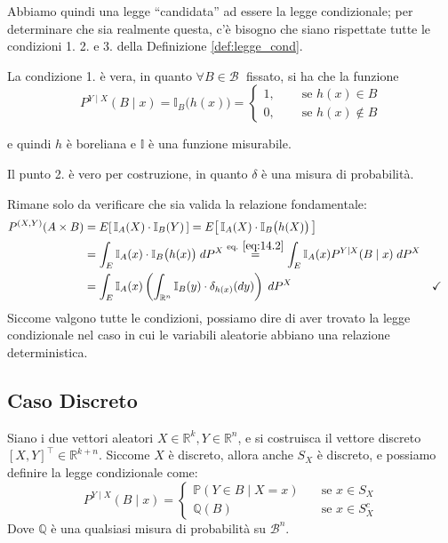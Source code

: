 Abbiamo quindi una legge ``candidata'' ad essere la legge condizionale; per determinare che sia realmente questa, c'è bisogno che siano rispettate tutte le condizioni 1. 2. e 3. della Definizione \ref{def:legge_cond}.

\medskip
\noindent La condizione 1. è vera, in quanto $\forall B\in\mathcal{B}\;$ fissato, si ha che la funzione
\begin{equation}P^{Y\mid X}(B\mid x) = \mathbb{I}_{B}\bigl(h(x)\bigr) = \begin{cases}
    1, \quad &\text{ se } h(x)\in B\\
    0, \quad &\text{ se } h(x)\notin B
\label{eq:14.2}
\end{cases}\end{equation}

e quindi $h$ è boreliana e $\mathbb{I}$ è una funzione misurabile.

\medskip
\noindent Il punto 2. è vero per costruzione, in quanto $\delta$ è una misura di probabilità.

\medskip
\noindent Rimane solo da verificare che sia valida la relazione fondamentale:
\begin{align*}
    P^{(X, Y)}(A\times B) & = E\!\left[\,\mathbb{I}_A(X)\cdot \mathbb{I}_B(Y)\,\right] = E\!\left[\,\mathbb{I}_A(X)\cdot \mathbb{I}_B\bigl(h(X)\bigr)\,\right] \\
    & = \int_E \mathbb{I}_A(x)\cdot \mathbb{I}_B\bigl(h(x)\bigr) \;dP^X \overset{\text{eq. }\eqref{eq:14.2}}{=} \int_E \mathbb{I}_A(x)P^{Y\mid X}(B\mid x)\;dP^X\\
    & = \int_E\mathbb{I}_A(x)\left(\int_{\mathbb{R}^n}\mathbb{I}_B(y)\cdot \delta_{h(x)}(dy)\right)\; dP^X && \checkmark
\end{align*}
Siccome valgono tutte le condizioni, possiamo dire di aver trovato la legge condizionale nel caso in cui le variabili aleatorie abbiano una relazione deterministica.

\subsection{Caso Discreto}

Siano i due vettori aleatori $X\in \mathbb{R}^k, Y\in\mathbb{R}^n$, e si costruisca il vettore discreto $[X, Y]^\top \in \mathbb{R}^{k+n}$. Siccome $X$ è discreto, allora anche $S_X$ è discreto, e possiamo definire la legge condizionale come:
\[\boxed{
P^{Y\mid X}(B\mid x)=\begin{cases}
    \mathbb{P}(Y\in B\mid X=x)\quad &\text{se }x\in S_X\\
    \mathbb{Q}(B) \quad &\text{se }x\in S_X^c
\end{cases}}\]
Dove $\mathbb{Q}$ è una qualsiasi misura di probabilità su $\mathcal{B}^n$.


